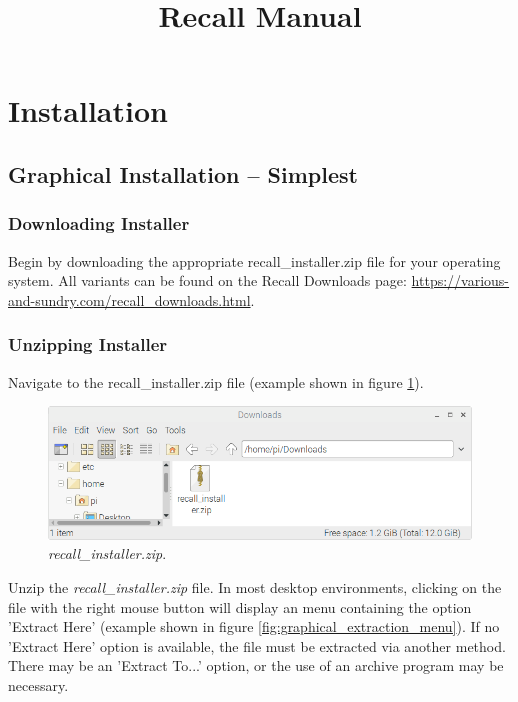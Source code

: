 \documentclass[letterpaper]{article}
\title{Recall Manual}
\begin{document}
\maketitle
\tableofcontents

\section{Installation}

\subsection{Graphical Installation -- Simplest} \label{graphical_install}
\subsubsection{Downloading Installer}
Begin by downloading the appropriate recall\_installer.zip file for your operating system. All variants can be found on the Recall Downloads page: \href{https://various-and-sundry.com/recall_downloads.html}{https://various-and-sundry.com/recall\_downloads.html}.

\subsubsection{Unzipping Installer}
Navigate to the recall\_installer.zip file (example shown in figure \ref{fig:graphical_zip_file}).

\begin{figure}[H]
  \centering
  \includegraphics[width=14cm]{images/graphical_install/zip_file.png}
  \caption{\textit{recall\_installer.zip}.}
  \label{fig:graphical_zip_file}
\end{figure}

Unzip the \textit{recall\_installer.zip} file. In most desktop environments, clicking on the file with the right mouse button will display an menu containing the option 'Extract Here' (example shown in figure \ref{fig:graphical_extraction_menu}). If no 'Extract Here' option is available, the file must be extracted via another method. There may be an 'Extract To...' option, or the use of an archive program may be necessary.
\end{document}
